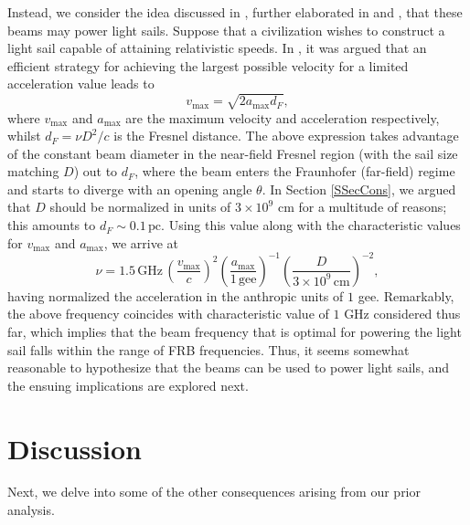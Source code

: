\documentclass[twocolumn,tighten]{aastex61}
\begin{document}
Instead, we consider the idea discussed in \citet{BBB10}, further elaborated in \citet{GL15} and \citet{BB16}, that these beams may power light sails. Suppose that a civilization wishes to construct a light sail capable of attaining relativistic speeds. In \citet{GL15}, it was argued that an efficient strategy for achieving the largest possible velocity for a limited acceleration value leads to
\begin{equation}
v_\mathrm{max} = \sqrt{2a_\mathrm{max}d_F},   
\end{equation}
where $v_\mathrm{max}$ and $a_\mathrm{max}$ are the maximum velocity and acceleration respectively, whilst $d_F = \nu D^2/c$ is the Fresnel distance. The above expression takes advantage of the constant beam diameter in the near-field Fresnel region (with the sail size matching $D$) out to $d_F$, where the beam enters the Fraunhofer (far-field) regime and starts to diverge with an opening angle $\theta$. In Section \ref{SSecCons}, we argued that $D$ should be normalized in units of $3 \times 10^9$ cm for a multitude of reasons; this amounts to $d_F \sim 0.1\,\mathrm{pc}$. Using this value along with the characteristic values for $v_\mathrm{max}$ and $a_\mathrm{max}$, we arrive at
\begin{equation} \label{Frequency}
\nu = 1.5\,\mathrm{GHz}\,\left(\frac{v_\mathrm{max}}{c}\right)^2 \left(\frac{a_\mathrm{max}}{1\,\mathrm{gee}}\right)^{-1} \left(\frac{D}{3\times 10^9\,\mathrm{cm}}\right)^{-2},
\end{equation}
having normalized the acceleration in the anthropic units of $1$ gee. Remarkably, the above frequency coincides with characteristic value of $1$ GHz considered thus far, which implies that the beam frequency that is optimal for powering the light sail falls within the range of FRB frequencies. Thus, it seems somewhat reasonable to hypothesize that the beams can be used to power light sails, and the ensuing implications are explored next.

\section{Discussion} \label{SecImps}
Next, we delve into some of the other consequences arising from our prior analysis.
\end{document}
